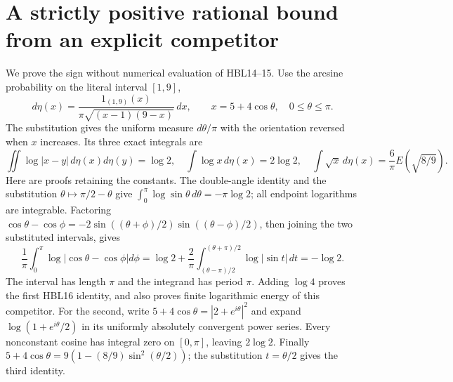 \section{A strictly positive rational bound from an explicit competitor}

We prove the sign without numerical evaluation of HBL14--15. Use the
arcsine probability on the literal interval $[1,9]$,
\[
 d\eta(x)=\frac{1_{(1,9)}(x)}{\pi\sqrt{(x-1)(9-x)}}\,dx,
 \qquad x=5+4\cos\theta,\quad 0\le\theta\le\pi.
\]
The substitution gives the uniform measure $d\theta/\pi$ with the
orientation reversed when $x$ increases. Its three exact integrals are
\[
 \iint\log|x-y|\,d\eta(x)d\eta(y)=\log2,\quad
 \int\log x\,d\eta(x)=2\log2,\quad
 \int\sqrt x\,d\eta(x)=\frac6\pi E(\sqrt{8/9}).
 \tag{HBL16}
\]
Here are proofs retaining the constants. The double-angle identity and
the substitution $\theta\mapsto\pi/2-\theta$ give
$\int_0^\pi\log\sin\theta\,d\theta=-\pi\log2$; all endpoint
logarithms are integrable. Factoring
$\cos\theta-\cos\phi=-2\sin((\theta+\phi)/2)
\sin((\theta-\phi)/2)$, then joining the two substituted intervals,
gives
\[
 \frac1\pi\int_0^\pi\log|\cos\theta-\cos\phi|d\phi
 =\log2+\frac2\pi\int_{(\theta-\pi)/2}^{(\theta+\pi)/2}
                              \log|\sin t|\,dt=-\log2.
\]
The interval has length $\pi$ and the integrand has period $\pi$.
Adding $\log4$ proves the first HBL16 identity, and also proves finite
logarithmic energy of this competitor. For the second, write
$5+4\cos\theta=|2+e^{i\theta}|^2$ and expand
$\log(1+e^{i\theta}/2)$ in its uniformly absolutely convergent power
series. Every nonconstant cosine has integral zero on $[0,\pi]$,
leaving $2\log2$. Finally
$5+4\cos\theta=9(1-(8/9)\sin^2(\theta/2))$; the substitution
$t=\theta/2$ gives the third identity.

